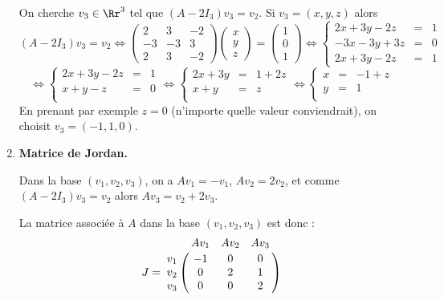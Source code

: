 \documentclass[12pt, class=report,crop=false]{standalone}
\begin{document}
\begin{exemple}
\begin{enumerate}
  On cherche $v_3 \in \Rr^3$ tel que $(A-2I_3)v_3 = v_2$.
  Si $v_3 = (x,y,z)$ alors
  $$(A-2I_3)v_3 = v_2 
  \iff 
  \begin{pmatrix}
  2 & 3 & -2 \\
  -3 & -3 & 3 \\
  2 & 3 & -2
  \end{pmatrix}
  \begin{pmatrix}
  x \\ y \\ z
  \end{pmatrix}
  = \begin{pmatrix}1\\0 \\1\end{pmatrix}
  \iff   
  \left\{\begin{array}{rcl}
  2x  + 3y -2z &=& 1\\
  -3x -3y + 3z &=& 0 \\
  2x  + 3y -2z &=& 1
  \end{array}\right.
  $$
  $$
  \iff
  \left\{\begin{array}{rcl}
  2x  + 3y -2z &=& 1\\
  x +y - z &=& 0 \\
  \end{array}\right.
 \iff
  \left\{\begin{array}{rcl}
  2x  + 3y &=& 1+2z\\
  x + y  &=& z \\
  \end{array}\right. 
  \iff
 \left\{\begin{array}{rcl}
  x &=& -1+z\\
  y &=& 1 \\
  \end{array}\right.   
  $$
  En prenant par exemple $z=0$ (n'importe quelle valeur conviendrait), on choisit
  $v_3 = (-1,1,0)$.
  
  
  \item \textbf{Matrice de Jordan.}
  
  Dans la base $(v_1,v_2,v_3)$, on a 
  $Av_1 = -v_1$, $A v_ 2 = 2v_2$, et
  comme $(A-2I_3) v_3 = v_2$ alors $A v_3 = v_2 + 2v_3$.
  
  La matrice associée à $A$ dans la base  $(v_1,v_2,v_3)$ est
  donc :
  $$J = %
  \bordermatrix{
  & Av_1 & Av_2 & Av_3 \cr
  v_1&-1 & 0 & 0 \cr
  v_2&0 & 2 & 1 \cr
  v_3&0 & 0 & 2}
  $$


\end{enumerate}
\end{exemple}
\end{document}
